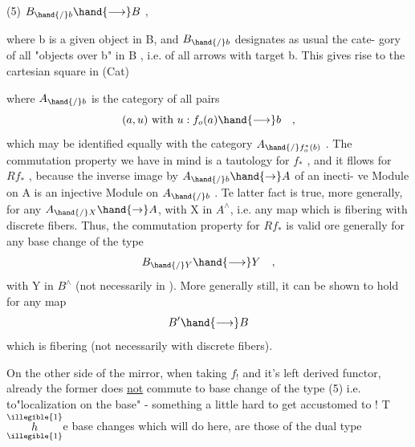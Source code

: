 
(5) \qquad $B_{\hand{/}b} \hand{\longrightarrow} B$ \quad ,

where b is a given object in B, and $B_{\hand{/}b}$ designates as usual the cate-%
gory of all "objects over b" in B , i.e. of all arrows  with target b.
This gives rise to the cartesian square in (Cat)


where $A_{\hand{/}b}$ is the category of all pairs
\[ (a,u) \text{ with } u : f_{o}(a) \hand{\longrightarrow} b \quad , \]
which may be identified equally with the category $A_{\hand{/}f_{o}^{*}(b)}$ . The
commutation property we have in mind is a tautology for $f_{*}$ , and it
fllows for $Rf_{*}$ , because the inverse image by $A_{\hand{/}b} \hand{\to} A$ of an inecti-%
ve Module on A is an injective Module on $A_{\hand{/}b}$ . \deleted{\unsure{(}}Te latter fact is
true, more generally, for any   $A_{\hand{/}X} \hand{\to} A$, with X in $A^{\wedge}$, i.e.
any map which is fibering with discrete fibers.\deleted{\unsure{)}} Thus, the commutation
property for $Rf_{*}$ is valid ore generally for any base change of the
type
\[ B_{\hand{/}Y} \hand{\longrightarrow} Y \quad , \]
with Y in $B^{\wedge}$ (not necessarily in ). More generally still, it can be
shown to hold for any map
\[ B' \hand{\longrightarrow} B \]
which is fibering (not necessarily with discrete fibers).

On the other side of the mirror, when taking $f_{!}$ and it's left
derived functor, already the former  does \uline{not} commute to base change
of the type (5) i.e. to"localization on the base" - something a little
hard to get accustomed to ! T$\overset{\illegible{1}}{\underset{\illegible{1}}{h}}$e base changes which will do here, are
those of the dual type

